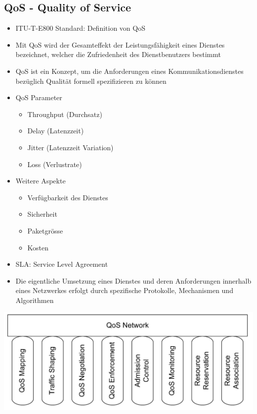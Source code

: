 \subsection{QoS - Quality of Service}
\begin{itemize}
\item ITU-T-E800 Standard: Definition von QoS
\item Mit QoS wird der Gesamteffekt der Leistungsfähigkeit eines Dienstes bezeichnet, welcher die Zufriedenheit des Dienstbenutzers bestimmt
\item QoS ist ein Konzept, um die Anforderungen eines Kommunikationsdienstes bezüglich Qualität formell spezifizieren zu können
\item QoS Parameter
\begin{itemize}
\item Throughput (Durchsatz)
\item Delay (Latenzzeit)
\item Jitter (Latenzzeit Variation)
\item Loss (Verlustrate)
\end{itemize}
\item Weitere Aspekte
\begin{itemize}
\item Verfügbarkeit des Dienstes
\item Sicherheit
\item Paketgrösse
\item Kosten
\end{itemize}
\item SLA: Service Level Agreement
\item Die eigentliche Umsetzung eines Dienstes und deren Anforderungen innerhalb eines Netzwerkes erfolgt durch spezifische Protokolle, Mechanismen und Algorithmen
\end{itemize}
\includegraphics[width = 0.75 \linewidth]{./pics/QosRef.png} \\

